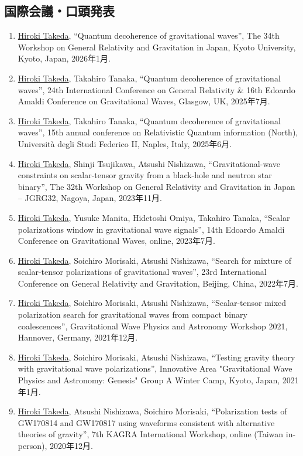 \documentclass[uplatex, 11pt]{jsarticle}
\begin{document}
\subsection*{国際会議・口頭発表}
\begin{enumerate}
\item \uline{Hiroki Takeda}, “Quantum decoherence of gravitational waves”, The 34th Workshop on General Relativity and Gravitation in Japan, Kyoto University, Kyoto, Japan, 2026年1月.
\item \uline{Hiroki Takeda}, Takahiro Tanaka, “Quantum decoherence of gravitational waves”, 24th International Conference on General Relativity \& 16th Edoardo Amaldi Conference on Gravitational Waves, Glasgow, UK, 2025年7月.
\item \uline{Hiroki Takeda}, Takahiro Tanaka, “Quantum decoherence of gravitational waves”, 15th annual conference on Relativistic Quantum information (North), Università degli Studi Federico II, Naples, Italy, 2025年6月.
\item \uline{Hiroki Takeda}, Shinji Tsujikawa, Atsushi Nishizawa, “Gravitational-wave constraints on scalar-tensor gravity from a black-hole and neutron star binary”, The 32th Workshop on General Relativity and Gravitation in Japan -- JGRG32, Nagoya, Japan, 2023年11月.
\item \uline{Hiroki Takeda}, Yusuke Manita, Hidetoshi Omiya, Takahiro Tanaka, “Scalar polarizations window in gravitational wave signals”, 14th Edoardo Amaldi Conference on Gravitational Waves, online, 2023年7月.
\item \uline{Hiroki Takeda}, Soichiro Morisaki, Atsushi Nishizawa, “Search for mixture of scalar-tensor polarizations of gravitational waves”, 23rd International Conference on General Relativity and Gravitation, Beijing, China, 2022年7月.
\item \uline{Hiroki Takeda}, Soichiro Morisaki, Atsushi Nishizawa, “Scalar-tensor mixed polarization search for gravitational waves from compact binary coalescences”, Gravitational Wave Physics and Astronomy Workshop 2021, Hannover, Germany, 2021年12月.
\item \uline{Hiroki Takeda}, Soichiro Morisaki, Atsushi Nishizawa, “Testing gravity theory with gravitational wave polarizations”, Innovative Area "Gravitational Wave Physics and Astronomy: Genesis" Group A Winter Camp, Kyoto, Japan, 2021年1月.
\item \uline{Hiroki Takeda}, Atsushi Nishizawa, Soichiro Morisaki, “Polarization tests of GW170814 and GW170817 using waveforms consistent with alternative theories of gravity”, 7th KAGRA International Workshop, online (Taiwan in-person), 2020年12月.

\end{enumerate}
\end{document}
